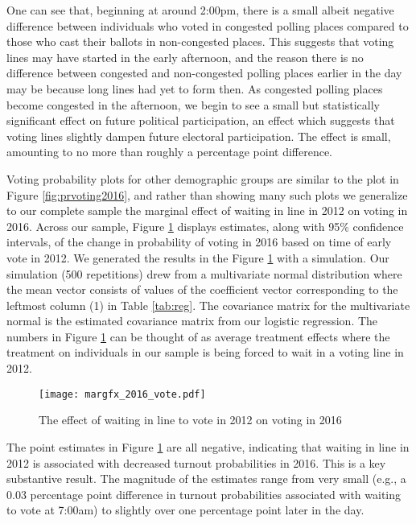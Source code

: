\documentclass[12pt,titlepage]{article}
\begin{document}
One can see that, beginning at around 2:00pm, there is a small albeit
negative difference between individuals who voted in congested polling
places compared to those who cast their ballots in non-congested
places.  This suggests that voting lines may have started in the early
afternoon, and the reason there is no difference between congested and
non-congested polling places earlier in the day may be because long
lines had yet to form then. As congested polling places become
congested in the afternoon, we begin to see a small but statistically
significant effect on future political participation, an effect which
suggests that voting lines slightly dampen future electoral
participation.  The effect is small, amounting to no more than roughly
a percentage point difference.

Voting probability plots for other demographic groups are similar to
the plot in Figure \ref{fig:prvoting2016}, and rather than showing
many such plots we generalize to our complete sample the marginal
effect of waiting in line in 2012 on voting in 2016.  Across our
sample, Figure \ref{fig:margfx2016} displays estimates, along with
95\% confidence intervals, of the change in probability of voting in
2016 based on time of early vote in 2012.  We generated the results in
the Figure \ref{fig:margfx2016} with a simulation.  Our simulation
(500 repetitions) drew from a multivariate normal distribution where
the mean vector consists of values of the coefficient vector
corresponding to the leftmost column (1) in Table \ref{tab:reg}.  The
covariance matrix for the multivariate normal is the estimated
covariance matrix from our logistic regression.  The numbers in Figure
\ref{fig:margfx2016} can be thought of as average treatment effects
where the treatment on individuals in our sample is being forced to
wait in a voting line in 2012.

%

\begin{figure}[!ht]
\caption{The effect of waiting in line to vote in 2012 on voting in 2016}
  \label{fig:margfx2016}
  \centering
    \centering\texttt{[image: margfx\_2016\_vote.pdf]}
\end{figure}


The point estimates in Figure \ref{fig:margfx2016} are all negative,
indicating that waiting in line in 2012 is associated with decreased
turnout probabilities in 2016.  This is a key substantive result.  The
magnitude of the estimates range from very small (e.g., a 0.03
percentage point difference in turnout probabilities associated with
waiting to vote at 7:00am) to slightly over one percentage point later
in the day.
\end{document}
